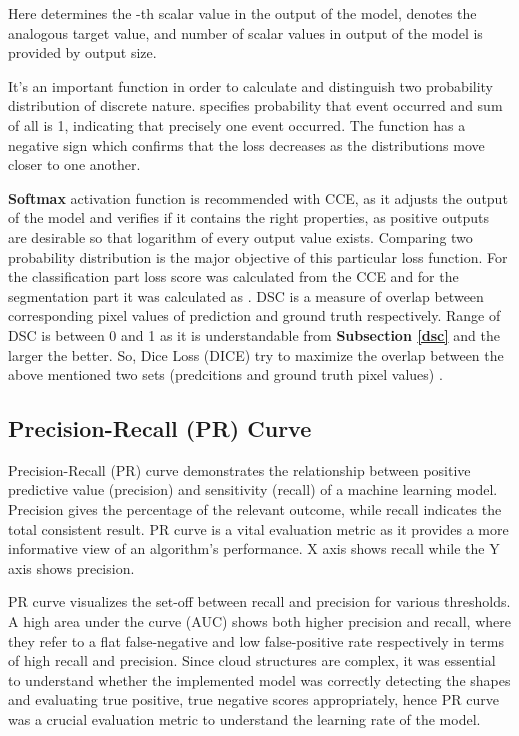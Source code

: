 \documentclass[conference]{IEEEtran}
\begin{document}
\begin{center}

\end{center}

Here  determines the -th scalar value in the output of the model,  denotes the analogous target value, and number of scalar values in output of the model is provided by output size.


It's an important function in order to calculate and distinguish two probability distribution of discrete nature.  specifies probability that event  occurred and sum of all  is 1, indicating that precisely one event occurred. The function has a negative sign which confirms that the loss decreases as the distributions move closer to one another.

\textbf{Softmax} activation function is recommended with CCE, as it adjusts the output of the model and verifies if it contains the right properties, as positive outputs are desirable so that logarithm of every output value  exists. Comparing two probability distribution is the major objective of this particular loss function. For the classification part loss score was calculated from the CCE and for the segmentation part it was calculated as .
DSC is a measure of overlap between corresponding pixel values of prediction and ground truth respectively. Range of DSC is between 0 and 1 as it is understandable from \textbf{Subsection \ref{dsc}} and the larger the better. So, Dice Loss (DICE) try to maximize the overlap between the above mentioned two sets (predcitions and ground truth pixel values) \cite{sudre2017generalised}.

\subsection{Precision-Recall (PR) Curve}

Precision-Recall (PR) curve demonstrates the relationship between positive predictive value (precision) and sensitivity (recall) of a machine learning model. Precision gives the percentage of the relevant outcome, while recall indicates the total consistent result. PR curve is a vital evaluation metric as it provides a more informative view of an algorithm's performance. X axis shows recall while the Y axis shows precision.

PR curve visualizes the set-off between recall and precision for various thresholds. A high area under the curve (AUC) shows both higher precision and recall, where they refer to a flat false-negative and low false-positive rate respectively in terms of high recall and precision. Since cloud structures are complex, it was essential to understand whether the implemented model was correctly detecting the shapes and evaluating true positive, true negative scores appropriately, hence PR curve was a crucial evaluation metric to understand the learning rate of the model.
\end{document}
